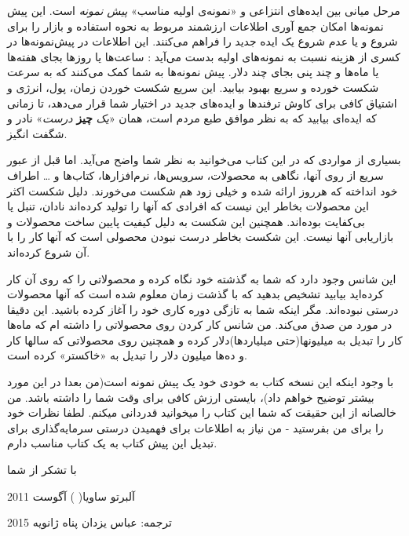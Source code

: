 مرحل میانی بین ایده‌های انتزاعی و «نمونه‌‌ی اولیه مناسب» \emph{پیش
نمونه} است. این پیش نمونه‌ها امکان جمع آوری اطلاعات ارزشمند مربوط به
نحوه استفاده و بازار را برای شروع و یا عدم شروع یک ایده جدید را فراهم
می‌کنند. این اطلاعات در پیش‌نمونه‌ها در کسری از هزینه نسبت به نمونه‌های
اولیه بدست می‌آید : ساعت‌ها یا روزها بجای هفته‌ها یا ماه‌ها و چند پنی
بجای چند دلار. پیش نمونه‌ها به شما کمک می‌کنند که به سرعت شکست خورده و
سریع بهبود بیابید. این سریع شکست خوردن زمان، پول، انرژی و اشتیاق کافی
برای کاوش ترفند‌ها و ایده‌های جدید در اختیار شما قرار می‌دهد، تا زمانی
که ایده‌ای بیابید که به نظر موافق طبع مردم است، همان «\emph{یک}
\textbf{چیز} \emph{درست}» نادر و شگفت انگیز.

بسیاری از مواردی که در این کتاب می‌خوانید به نظر شما واضح می‌آید. اما
قبل از عبور سریع از روی آنها، نگاهی به محصولات، سرویس‌ها، نرم‌افزارها،
کتاب‌ها و \ldots{} اطراف خود انداخته که هرروز ارائه شده و خیلی زود هم
شکست می‌خورند. دلیل شکست اکثر این محصولات بخاطر این نیست که افرادی که
آنها را تولید کرده‌اند نادان، تنبل یا بی‌کفایت بوده‌اند. همچنین این شکست
به دلیل کیفیت پایین ساخت محصولات و بازاریابی آنها نیست. این شکست بخاطر
درست نبودن محصولی است که آنها کار را با آن شروع کرده‌اند.

این شانس وجود دارد که شما به گذشته خود نگاه کرده و محصولاتی را که روی آن
کار کرده‌اید بیابید تشخیص بدهید که با گذشت زمان معلوم شده است که آنها
محصولات درستی نبوده‌اند. مگر اینکه شما به تازگی دوره کاری خود را آغاز
کرده باشید. این دقیقا در مورد من صدق می‌کند. من شانس کار کردن روی
محصولاتی را داشته ام که ماه‌ها کار را تبدیل به میلیونها(حتی
میلیاردها)دلار کرده و همچنین روی محصولاتی که سالها کار و ده‌ها میلیون
دلار را تبدیل به «خاکستر» کرده است.

با وجود اینکه این نسخه کتاب به خودی خود یک پیش نمونه است(من بعدا در این
مورد بیشتر توضیح خواهم داد)، بایستی ارزش کافی برای وقت شما را داشته
باشد. من خالصانه از این حقیقت که شما این کتاب را میخوانید قدردانی میکنم.
لطفا نظرات خود را برای من بفرستید - من نیاز به اطلاعات برای فهمیدن درستی
سرمایه‌گذاری برای تبدیل این پیش کتاب به یک کتاب مناسب دارم.

با تشکر از شما

آلبرتو ساویا(  ) آگوست 2011

ترجمه: عباس یزدان پناه ژانویه 2015
